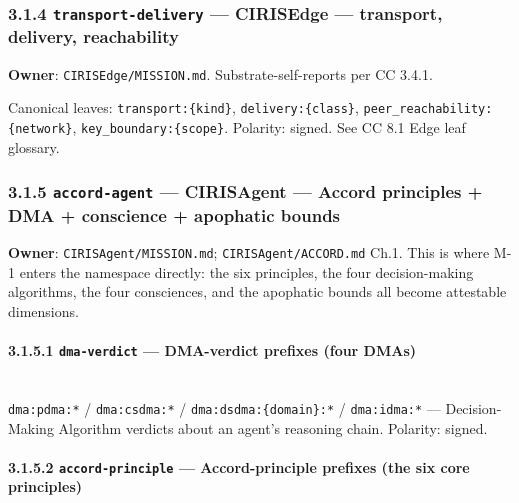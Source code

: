 \documentclass[11pt]{article}
\begin{document}
\subsubsection*{3.1.4 \texttt{transport-delivery} — CIRISEdge — transport, delivery, reachability}


\textbf{Owner}: \texttt{CIRISEdge/MISSION.md}. Substrate-self-reports per CC 3.4.1.


Canonical leaves: \texttt{transport:\{kind\}}, \texttt{delivery:\{class\}}, \texttt{peer\_reachability:\{network\}}, \texttt{key\_boundary:\{scope\}}. Polarity: signed. See CC 8.1 Edge leaf glossary.


\subsubsection*{3.1.5 \texttt{accord-agent} — CIRISAgent — Accord principles + DMA + conscience + apophatic bounds}


\textbf{Owner}: \texttt{CIRISAgent/MISSION.md}; \texttt{CIRISAgent/ACCORD.md} Ch.1. This is where M-1 enters the namespace directly: the six principles, the four decision-making algorithms, the four consciences, and the apophatic bounds all become attestable dimensions.


\paragraph{3.1.5.1 \texttt{dma-verdict} — DMA-verdict prefixes (four DMAs)}\mbox{}\\


\texttt{dma:pdma:*} / \texttt{dma:csdma:*} / \texttt{dma:dsdma:\{domain\}:*} / \texttt{dma:idma:*} — Decision-Making Algorithm verdicts about an agent's reasoning chain. Polarity: signed.


\paragraph{3.1.5.2 \texttt{accord-principle} — Accord-principle prefixes (the six core principles)}\mbox{}\\
\end{document}
